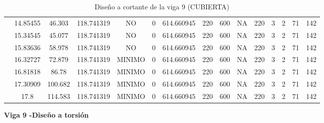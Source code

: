 \begin{table}[H]
{\begin{tabular}{|c|c|c|c|c|c|c|c|c|c|c|c|c|c|c|}
\cline{2-15}    & 14.85455 & 46.303 & 118.741319 & NO  & 0   & 614.660945 & 220 & 600 & NA  & 220 & 3   & 2   & 71  & 142 \bigstrut\\
\cline{2-15}    & 15.34545 & 45.077 & 118.741319 & NO  & 0   & 614.660945 & 220 & 600 & NA  & 220 & 3   & 2   & 71  & 142 \bigstrut\\
\cline{2-15}    & 15.83636 & 58.978 & 118.741319 & NO  & 0   & 614.660945 & 220 & 600 & NA  & 220 & 3   & 2   & 71  & 142 \bigstrut\\
\cline{2-15}    & 16.32727 & 72.879 & 118.741319 & MINIMO & 0   & 614.660945 & 220 & 600 & NA  & 220 & 3   & 2   & 71  & 142 \bigstrut\\
\cline{2-15}    & 16.81818 & 86.78 & 118.741319 & MINIMO & 0   & 614.660945 & 220 & 600 & NA  & 220 & 3   & 2   & 71  & 142 \bigstrut\\
\cline{2-15}    & 17.30909 & 100.682 & 118.741319 & MINIMO & 0   & 614.660945 & 220 & 600 & NA  & 220 & 3   & 2   & 71  & 142 \bigstrut\\
\cline{2-15}    & 17.8 & 114.583 & 118.741319 & MINIMO & 0   & 614.660945 & 220 & 600 & NA  & 220 & 3   & 2   & 71  & 142 \bigstrut\\
\hline
\end{tabular}%



  
 
  }%
    \caption{Diseño a cortante de la viga 9 (CUBIERTA) }
  \label{tab:C VG9 CUB }%
\end{table}%
\newpage
\textbf{Viga 9 -Diseño a torsión}
